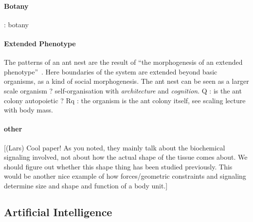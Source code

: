 \documentclass[fleqn,10pt]{wlscirep}
\begin{document}
\paragraph{Botany}

\cite{lord1981cleistogamy} : botany

\paragraph{Extended Phenotype}

The patterns of an ant nest are the result of ``the morphogenesis of an extended phenotype''~\cite{minter2012morphogenesis}. Here boundaries of the system are extended beyond basic organisms, as a kind of social morphogenesis. The ant nest can be seen as a larger scale organism ? self-organisation with \emph{architecture} and \emph{cognition}. Q : is the ant colony autopoietic ? Rq : the organism is the ant colony itself, see scaling lecture with body mass.


\paragraph{other}

[(Lars) Cool paper! As you noted, they mainly talk about the biochemical signaling involved, not about how the actual shape of the tissue comes about. We should figure out whether this shape thing has been studied previously. This would be another nice example of how forces/geometric constraints and signaling determine size and shape and function of a body unit.]

\cite{han2016coordinating}




\subsection*{Artificial Intelligence}

\end{document}

